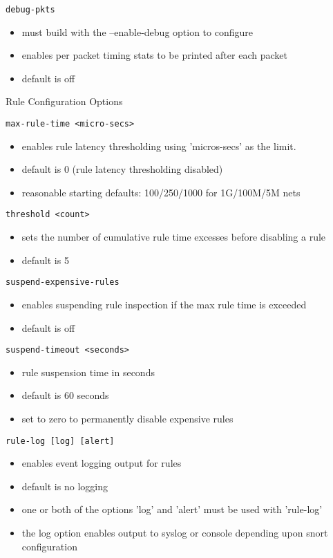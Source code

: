 \documentclass[english]{report}
\begin{document}
\texttt{debug-pkts}
\begin{itemize}
\item must build with the --enable-debug option to configure
\item enables per packet timing stats to be printed after each packet
\item default is off
\end{itemize}

Rule Configuration Options

\texttt{max-rule-time <micro-secs>}
\begin{itemize}
\item enables rule latency thresholding using 'micros-secs' as the limit.
\item default is 0 (rule latency thresholding disabled)
\item reasonable starting defaults: 100/250/1000 for 1G/100M/5M nets
\end{itemize}

\texttt{threshold <count>}
\begin{itemize}
\item sets the number of cumulative rule time excesses before disabling
      a rule
\item default is 5
\end{itemize}

\texttt{suspend-expensive-rules}
\begin{itemize}
\item enables suspending rule inspection if the max rule time is exceeded
\item default is off
\end{itemize}

\texttt{suspend-timeout <seconds>}
\begin{itemize}
\item rule suspension time in seconds
\item default is 60 seconds
\item set to zero to permanently disable expensive rules
\end{itemize}

\texttt{rule-log [log] [alert]}
\begin{itemize}
\item enables event logging output for rules
\item default is no logging
\item one or both of the options 'log' and 'alert' must be used with
      'rule-log'
\item the log option enables output to syslog or console depending 
      upon snort configuration
\end{itemize}
\end{document}
